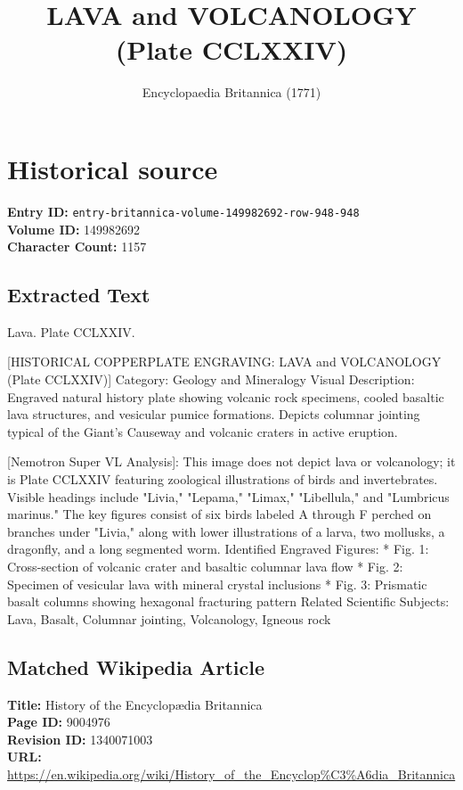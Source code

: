 \documentclass{article}
\title{LAVA and VOLCANOLOGY (Plate CCLXXIV)}
\date{Encyclopaedia Britannica (1771)}
\begin{document}
\maketitle

\section*{Historical source}
\textbf{Entry ID:} \texttt{entry-britannica-volume-149982692-row-948-948} \\
\textbf{Volume ID:} 149982692 \\
\textbf{Character Count:} 1157

\subsection*{Extracted Text}
Lava.
Plate CCLXXIV.

[HISTORICAL COPPERPLATE ENGRAVING: LAVA and VOLCANOLOGY (Plate CCLXXIV)]
Category: Geology and Mineralogy
Visual Description: Engraved natural history plate showing volcanic rock specimens, cooled basaltic lava structures, and vesicular pumice formations. Depicts columnar jointing typical of the Giant's Causeway and volcanic craters in active eruption.

[Nemotron Super VL Analysis]: This image does not depict lava or volcanology; it is Plate CCLXXIV featuring zoological illustrations of birds and invertebrates. Visible headings include "Livia," "Lepama," "Limax," "Libellula," and "Lumbricus marinus." The key figures consist of six birds labeled A through F perched on branches under "Livia," along with lower illustrations of a larva, two mollusks, a dragonfly, and a long segmented worm.
Identified Engraved Figures:
  * Fig. 1: Cross-section of volcanic crater and basaltic columnar lava flow
  * Fig. 2: Specimen of vesicular lava with mineral crystal inclusions
  * Fig. 3: Prismatic basalt columns showing hexagonal fracturing pattern
Related Scientific Subjects: Lava, Basalt, Columnar jointing, Volcanology, Igneous rock

\subsection*{Matched Wikipedia Article}
\textbf{Title:} History of the Encyclopædia Britannica \\
\textbf{Page ID:} 9004976 \\
\textbf{Revision ID:} 1340071003 \\
\textbf{URL:} \url{https://en.wikipedia.org/wiki/History\_of\_the\_Encyclop\%C3\%A6dia\_Britannica}
\end{document}
